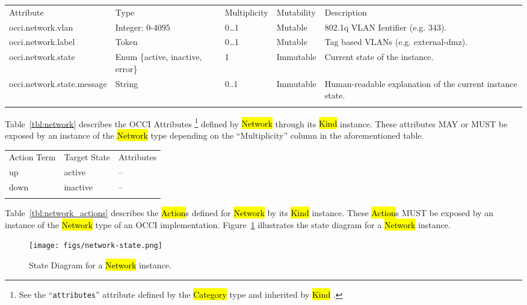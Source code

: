 \documentclass[10pt,a4paper]{article}
\begin{document}
{
	\begin{tabular}{lp{2.5cm}p{1cm}lp{5cm}}
	\toprule
	Attribute&Type&Multi\-plicity&Mutability&Description\\
	\colrule
	occi.network.vlan & Integer: 0-4095 & 0\ldots1 & Mutable
	& 802.1q VLAN Ientifier (e.g. 343).\\
	occi.network.label & Token & 0\ldots1 & Mutable
	& Tag based VLANs (e.g. external-dmz).\\
	occi.network.state & Enum \{active, inactive, error\} & 1 & Immutable
	& Current state of the instance.\\
	occi.network.state.message & String & 0..1 & Immutable
	& Human-readable explanation of the current instance state.\\
	\botrule
	\end{tabular}
}

Table~\ref{tbl:network} describes the OCCI Attributes%
\footnote{See the ``{\tt attributes}'' attribute defined by the
  \hl{Category} type and inherited by \hl{Kind} \cite{occi:core}.}
defined by \hl{Network} through its \hl{Kind} instance. These attributes
MAY or MUST be exposed by an instance of the \hl{Network} type
depending on the ``Multiplicity'' column in the aforementioned table.

{
	\begin{tabular}{lll}
	\toprule
	Action Term&Target State&Attributes\\
	\colrule
	up & active & --\\
	down & inactive & --\\
	\botrule
	\end{tabular}
}

Table~\ref{tbl:network_actions} describes the \hl{Action}s defined for
\hl{Network} by its \hl{Kind} instance. These \hl{Action}s MUST be
exposed by an instance of the \hl{Network} type of an OCCI
implementation.  Figure~\ref{fig:network_state} illustrates the state
diagram for a \hl{Network} instance.

\begin{figure}[!h]
	\centering
	\texttt{[image: figs/network-state.png]}
	\caption{State Diagram for a \hl{Network} instance.}
	\label{fig:network_state}
\end{figure}
\end{document}
